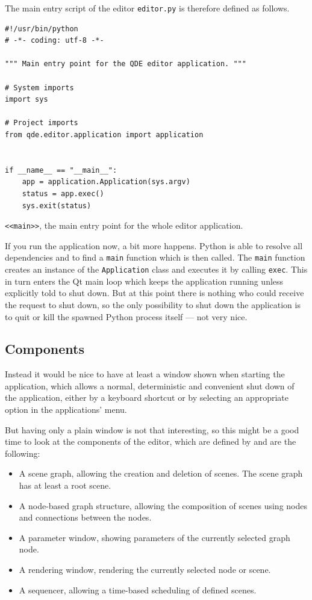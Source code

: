 \documentclass[10pt, openright, notitlepage]{scrreprt}
\begin{document}
The main entry script of the editor \texttt{editor.py} is therefore defined as follows.

\begin{listing}[H]
\begin{verbatim}
#!/usr/bin/python
# -*- coding: utf-8 -*-

""" Main entry point for the QDE editor application. """

# System imports
import sys

# Project imports
from qde.editor.application import application


if __name__ == "__main__":
    app = application.Application(sys.argv)
    status = app.exec()
    sys.exit(status)
\end{verbatim}
\caption{\label{main}
\texttt{<<main>>}, the main entry point for the whole editor application.}
\end{listing}

If you run the application now, a bit more happens. Python is able to
resolve all dependencies and to find a \texttt{main} function which is then called.
The \texttt{main} function creates an instance of the \texttt{Application} class and executes
it by calling \texttt{exec}. This in turn enters the Qt main loop which keeps the
application running unless explicitly told to shut down. But at this point there
is nothing who could receive the request to shut down, so the only possibility
to shut down the application is to quit or kill the spawned Python process
itself --- not very nice.

\subsection{Components}
\label{sec:components}
Instead it would be nice to have at least a window shown when starting the
application, which allows a normal, deterministic and convenient shut down of
the application, either by a keyboard shortcut or by selecting an appropriate
option in the applications' menu.

But having only a plain window is not that interesting, so this might be a good
time to look at the components of the editor, which are defined by
\citep[p. 29 ff.]{osterwalder_qde_2016} and are the following:

\begin{itemize}
\item A scene graph, allowing the creation and deletion of scenes. The scene graph
has at least a root scene.
\item A node-based graph structure, allowing the composition of scenes using nodes
and connections between the nodes.
\item A parameter window, showing parameters of the currently selected graph node.
\item A rendering window, rendering the currently selected node or scene.
\item A sequencer, allowing a time-based scheduling of defined scenes.
\end{itemize}
\end{document}
